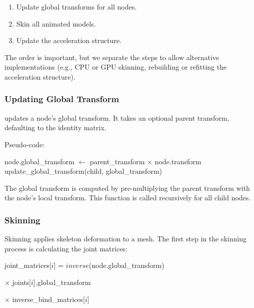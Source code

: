 \begin{enumerate}
    \item Update global transforms for all nodes.
    \item Skin all animated models.
    \item Update the acceleration structure.
\end{enumerate}

The order is important, but we separate the steps to allow alternative implementations (e.g., CPU or GPU skinning, rebuilding or refitting the acceleration structure).

\subsubsection{Updating Global Transform}

 updates a node's global transform. It takes an optional  parent transform, defaulting to the identity matrix.

Pseudo-code:

\begin{algorithm}[H]

\caption{Pseudo code for updating the global transform}\label{alg:global-transform}
    
\begin{algorithmic}[1]
        \State node.global\_transform $\gets$ parent\_transform $\times$ node.transform
            \State update\_global\_transform(child, global\_transform)
        \EndFor
    \EndFunction
\end{algorithmic}

\end{algorithm}

The global transform is computed by pre-multiplying the parent transform with the node's local transform. This function is called recursively for all child nodes.

\subsubsection{Skinning}

Skinning applies skeleton deformation to a mesh. The first step in the skinning process is calculating the joint matrices:

\begin{algorithm}[H]

\caption{Calculating joint matrices}\label{alg:joint-matrices}

\begin{algorithmic}[1]
        \State joint\_matrices[$i$] =  $inverse$(node.global\_transform)
        
        $\times$ joints[$i$].global\_transform
        
        $\times$ inverse\_bind\_matrices[$i$]
    \EndFor
\end{algorithmic}

\end{algorithm}

